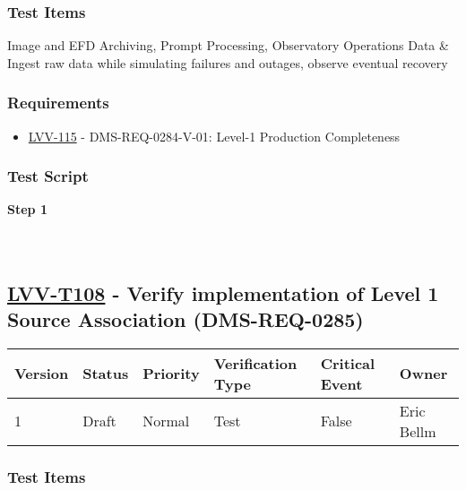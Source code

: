 \hypertarget{test-items-83}{%
\subsubsection{Test Items}\label{test-items-83}}

Image and EFD Archiving, Prompt Processing, Observatory Operations Data
\& Ingest raw data while simulating failures and outages, observe
eventual recovery

\hypertarget{requirements-84}{%
\subsubsection{Requirements}\label{requirements-84}}

\begin{itemize}
\tightlist
\item
  \href{https://jira.lsstcorp.org/browse/LVV-115}{LVV-115} -
  DMS-REQ-0284-V-01: Level-1 Production Completeness
\end{itemize}

\hypertarget{test-script-84}{%
\subsubsection{Test Script}\label{test-script-84}}

\textbf{Step 1}\\
~\\
~\\

\hypertarget{lvv-t108---verify-implementation-of-level-1-source-association-dms-req-0285}{%
\subsection{\texorpdfstring{\href{https://jira.lsstcorp.org/secure/Tests.jspa\#/testCase/LVV-T108}{LVV-T108}
- Verify implementation of Level 1 Source Association
(DMS-REQ-0285)}{LVV-T108 - Verify implementation of Level 1 Source Association (DMS-REQ-0285)}}\label{lvv-t108---verify-implementation-of-level-1-source-association-dms-req-0285}}

\begin{longtable}[]{@{}llllll@{}}
\toprule
Version & Status & Priority & Verification Type & Critical Event &
Owner\tabularnewline
\midrule
\endhead
1 & Draft & Normal & Test & False & Eric Bellm\tabularnewline
\bottomrule
\end{longtable}

\hypertarget{test-items-84}{%
\subsubsection{Test Items}\label{test-items-84}}

